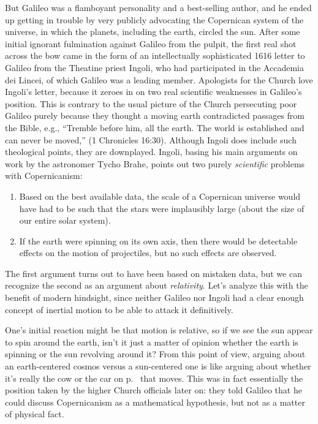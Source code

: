 But Galileo was a flamboyant personality and a best-selling author, and he ended up
getting in trouble by very publicly advocating the Copernican system of the universe,
in which the planets, including the earth, circled the sun. After some initial ignorant
fulmination against Galileo from the pulpit, the first real shot across the
bow came in the form of an intellectually sophisticated 1616 letter to Galileo from the Theatine priest Ingoli,
who had participated in the Accademia dei Lincei, of which Galileo was a leading member.
Apologists for the Church love Ingoli's letter, because it zeroes in on two
real scientific weaknesses in Galileo's position. This is contrary to the usual
picture of the Church persecuting poor Galileo purely because they thought a moving
earth contradicted passages from the Bible, e.g., ``Tremble before him, all the earth.
The world is established and can never be moved,'' (1 Chronicles 16:30). Although
Ingoli does include such theological points, they are downplayed.
Ingoli, basing his main arguments on work by the astronomer Tycho Brahe, points out
two purely \emph{scientific} problems with Copernicanism:

\begin{enumerate}
\item Based on the best available data, the scale
of a Copernican universe would have had to be such that the stars were implausibly large (about the
size of our entire solar system).
\item If the earth were spinning on its own axis, then there would be detectable effects on
the motion of projectiles, but no such effects are observed.
\end{enumerate}

The first argument turns out to have been based on mistaken data, but we can recognize the
second as an argument about \emph{relativity}.  Let's analyze this with the benefit of
modern hindsight, since neither Galileo nor Ingoli had a clear enough concept of
inertial motion to be able to attack it definitively.

One's initial reaction might be that motion is relative,
so if we see the sun appear to spin around the earth, isn't it just
a matter of opinion whether the earth is spinning or the sun revolving around it? From
this point of view, arguing about an earth-centered cosmos versus a sun-centered one is
like arguing about whether it's really the cow or the car on p.~\pageref{fig:cow-and-car} that moves.
This was in fact essentially the position taken by the higher Church officials later on: they
told Galileo that he could discuss Copernicanism as a mathematical hypothesis, but not as
a matter of physical fact.

